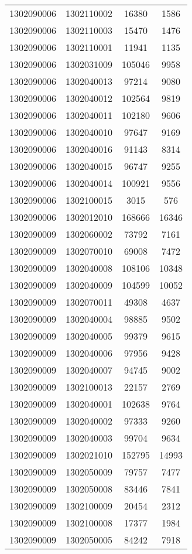 \begin{longtable}{llcc}
1302090006 & 1302110002 & 16380 & 1586\\
1302090006 & 1302110003 & 15470 & 1476\\
1302090006 & 1302110001 & 11941 & 1135\\
1302090006 & 1302031009 & 105046 & 9958\\
1302090006 & 1302040013 & 97214 & 9080\\
1302090006 & 1302040012 & 102564 & 9819\\
1302090006 & 1302040011 & 102180 & 9606\\
1302090006 & 1302040010 & 97647 & 9169\\
1302090006 & 1302040016 & 91143 & 8314\\
1302090006 & 1302040015 & 96747 & 9255\\
1302090006 & 1302040014 & 100921 & 9556\\
1302090006 & 1302100015 & 3015 & 576\\
1302090006 & 1302012010 & 168666 & 16346\\
1302090009 & 1302060002 & 73792 & 7161\\
1302090009 & 1302070010 & 69008 & 7472\\
1302090009 & 1302040008 & 108106 & 10348\\
1302090009 & 1302040009 & 104599 & 10052\\
1302090009 & 1302070011 & 49308 & 4637\\
1302090009 & 1302040004 & 98885 & 9502\\
1302090009 & 1302040005 & 99379 & 9615\\
1302090009 & 1302040006 & 97956 & 9428\\
1302090009 & 1302040007 & 94745 & 9002\\
1302090009 & 1302100013 & 22157 & 2769\\
1302090009 & 1302040001 & 102638 & 9764\\
1302090009 & 1302040002 & 97333 & 9260\\
1302090009 & 1302040003 & 99704 & 9634\\
1302090009 & 1302021010 & 152795 & 14993\\
1302090009 & 1302050009 & 79757 & 7477\\
1302090009 & 1302050008 & 83446 & 7841\\
1302090009 & 1302100009 & 20454 & 2312\\
1302090009 & 1302100008 & 17377 & 1984\\
1302090009 & 1302050005 & 84242 & 7918\\

\end{longtable}
